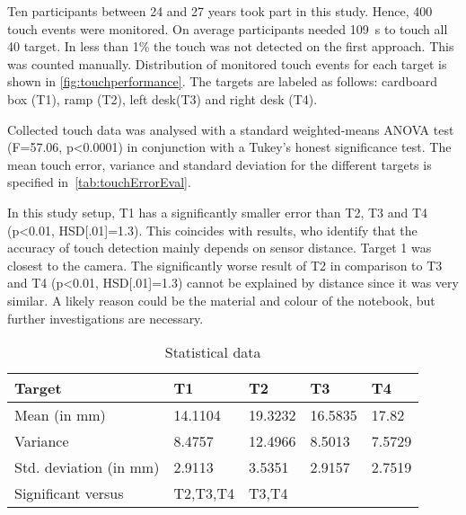 Ten participants between 24 and 27 years took part in this study. Hence, 400 touch events were monitored. On average participants needed \SI{109}{\second} to touch all 40 target. In less than 1\% the touch was not detected on the first approach. This was counted manually. Distribution of monitored touch events for each target is shown in \autoref{fig:touchperformance}. The targets are labeled as follows: cardboard box (T1), ramp (T2), left desk(T3) and right desk (T4). 


Collected touch data was analysed with a standard weighted-means ANOVA test (F=57.06, p<0.0001)  in conjunction with a  Tukey's honest significance test.
The mean touch error, variance and standard deviation for the different targets is specified in~\autoref{tab:touchErrorEval}.

In this study setup, T1 has a significantly smaller error than T2, T3 and T4 (p<0.01, HSD[.01]=1.3). This coincides with \textcite{Hardy:2012jo} results, who identify that the accuracy of touch detection mainly depends on sensor distance. Target 1 was closest to the camera. The significantly worse result of T2 in comparison to T3 and T4 (p<0.01, HSD[.01]=1.3) cannot be explained by distance since it was very similar. A likely reason could be the material and colour of the notebook, but further investigations are necessary. 

\begin{table}[htb]
\begin{tabularx}{\textwidth}{ l|XXXl}
\toprule
Target & T1 & T2 & T3 & T4 \\
\midrule
Mean (in mm) & 14.1104 & 19.3232 & 16.5835 & 17.82 \\
Variance & 8.4757 & 12.4966 & 8.5013 & 7.5729 \\
Std. deviation (in mm) & 2.9113 & 3.5351 & 2.9157 & 2.7519 \\
Significant versus & T2,T3,T4 & T3,T4 \\
\bottomrule
\end{tabularx}
\caption{Statistical data}
\label{tab:touchErrorEval}
\end{table}

